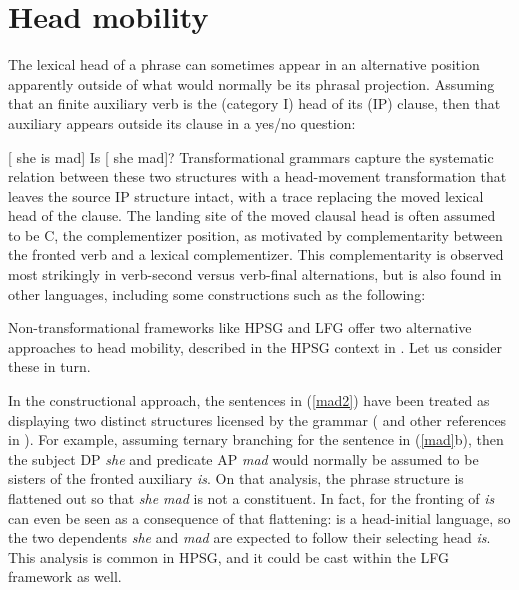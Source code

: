 \section{Head mobility} 
\label{mobile-sec}
The lexical head of a phrase can sometimes appear in an alternative position apparently outside of what would normally be its phrasal projection.  Assuming that an  finite auxiliary verb is the (category I) head of its (IP) clause, then that auxiliary appears outside its clause in a yes/no question:

\eal 
\label{mad}
\ex {} [ she is mad]
\ex Is [ she \trace{} mad]?
\zl
Transformational grammars capture the systematic relation between these two structures with a head-movement transformation that leaves the source IP structure intact, with a trace replacing the moved lexical head of the clause.  The landing site of the moved clausal head is often assumed to be C, the complementizer position, as motivated by complementarity between the fronted verb and a lexical complementizer.  This complementarity is observed most strikingly in  verb-second versus verb-final alternations, but is also found in other languages, including some  constructions such as the following:  

\eal 
\label{mad2}
\zl 
Non-transformational frameworks like HPSG and LFG offer two alternative approaches to head mobility, described in the HPSG context in .  Let us consider these in turn.

In the constructional approach,  
 the sentences in (\ref{mad2}) have been treated as displaying two distinct structures licensed by the grammar (\citealt{Sag2020a} and other references in ).  For example, assuming ternary branching for the sentence in (\ref{mad}b), then the subject DP \textit{she} and predicate AP \textit{mad} would normally be assumed to be sisters of the fronted auxiliary \textit{is}.  On that analysis, the phrase structure is flattened out so that \textit{she mad} is not a constituent.  In fact, for  the fronting of \textit{is} can even be seen as a consequence of that flattening:   is a head-initial language, so the two dependents \textit{she} and \textit{mad} are expected to follow their selecting head \textit{is}.  This analysis is common in HPSG, and it could be cast within the LFG framework as well.  


